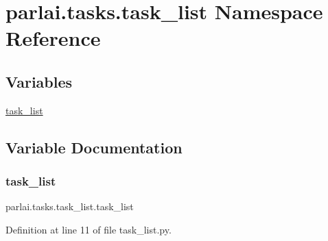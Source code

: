 \hypertarget{namespaceparlai_1_1tasks_1_1task__list}{}\section{parlai.\+tasks.\+task\+\_\+list Namespace Reference}
\label{namespaceparlai_1_1tasks_1_1task__list}
\subsection*{Variables}
\begin{DoxyCompactItemize}
\item 
\hyperlink{namespaceparlai_1_1tasks_1_1task__list_af693c16c461df8b77e7704fef23abb7b}{task\+\_\+list}
\end{DoxyCompactItemize}


\subsection{Variable Documentation}
\mbox{\label{namespaceparlai_1_1tasks_1_1task__list_af693c16c461df8b77e7704fef23abb7b}} 
\subsubsection{\texorpdfstring{task\+\_\+list}{task\_list}}
{\footnotesize\ttfamily parlai.\+tasks.\+task\+\_\+list.\+task\+\_\+list}



Definition at line 11 of file task\+\_\+list.\+py.

